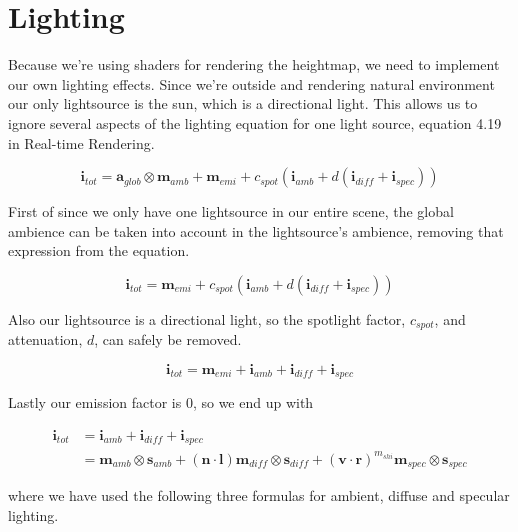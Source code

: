 \section{Lighting}

Because we're using shaders for rendering the heightmap, we need to
implement our own lighting effects. Since we're outside and rendering
natural environment our only lightsource is the sun, which is a
directional light. This allows us to ignore several aspects of the
lighting equation for one light source, equation 4.19 in Real-time
Rendering. 

\begin{displaymath}
  \mathbf{i}_{tot} = \mathbf{a}_{glob} \otimes \mathbf{m}_{amb} +
  \mathbf{m}_{emi} + c_{spot}(\mathbf{i}_{amb} + d(\mathbf{i}_{diff} + \mathbf{i}_{spec}))
\end{displaymath}

First of since we only have one lightsource in our entire
scene, the global ambience can be taken into account in the
lightsource's ambience, removing that expression from the
equation.

\begin{displaymath}
  \mathbf{i}_{tot} = \mathbf{m}_{emi} + c_{spot}(\mathbf{i}_{amb} + d(\mathbf{i}_{diff} + \mathbf{i}_{spec}))
\end{displaymath}

Also our lightsource is a directional light, so the spotlight factor,
$c_{spot}$, and attenuation, $d$, can safely be removed.

\begin{displaymath}
  \mathbf{i}_{tot} = \mathbf{m}_{emi} + \mathbf{i}_{amb} + \mathbf{i}_{diff} + \mathbf{i}_{spec}
\end{displaymath}

Lastly our emission factor is 0, so we end up with

\begin{displaymath}
  \begin{array}{rl}
    \mathbf{i}_{tot} &= \mathbf{i}_{amb} + \mathbf{i}_{diff} +
    \mathbf{i}_{spec}\\
    &= \mathbf{m}_{amb} \otimes \mathbf{s}_{amb} + (\mathbf{n} \cdot
    \mathbf{l}) \mathbf{m}_{diff} \otimes \mathbf{s}_{diff} +
    (\mathbf{v} \cdot \mathbf{r})^{m_{shi}} \mathbf{m}_{spec} \otimes
    \mathbf{s}_{spec} 
  \end{array}
\end{displaymath}

where we have used the following three formulas for ambient, diffuse
and specular lighting.

